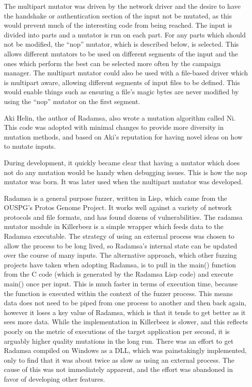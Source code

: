 The multipart mutator was driven by the network driver and the desire to have
the handshake or authentication section of the input not be mutated, as this
would prevent much of the interesting code from being reached.  The input is
divided into parts and a mutator is run on each part. For any parts which
should not be modified, the ``nop'' mutator, which is described below, is
selected. This allows different mutators to be used on different segments of
the input and the ones which perform the best can be selected more often by the
campaign manager.  The multipart mutator could also be used with a file-based
driver which is multipart aware, allowing different segments of input files to
be defined.  This would enable things such as ensuring a file's magic bytes are
never modified by using the ``nop'' mutator on the first segment.

Aki Helin, the author of Radamsa, also wrote a mutation algorithm called Ni.
This code was adopted with minimal changes to provide more diversity in
mutation methods, and based on Aki's reputation for having novel ideas on how
to mutate inputs.

During development, it quickly became clear that having a mutator which does
not do any mutation would be handy when debugging issues.  This is how the nop
mutator was born. It was later used when the multipart mutator was developed.

Radamsa is a general purpose fuzzer, written in Lisp, which came from the
OUSPG's Protos Genome Project.\cite{genome} It works well against a variety of network
protocols and file formats, and has found dozens of vulnerabilities.  The
radamsa mutator module in Killerbeez is a simple wrapper which feeds data
to the Radamsa executable.  The strategy of using an external process was chosen
to allow the process to be long lived, so Radamsa's internal state can be
updated over the course of many inputs.  The alternative approach, which
other fuzzing projects have taken when adopting Radamsa, is to pull in the main()
function from the C code (which is generated by the Radamsa Lisp code) and
execute main() once per input.\cite{radamsatob}  This is much faster
in terms of execution time, because the function is executed within the context of the
fuzzer process.  This means data does not need to be piped from one process
to another and then back again, however it loses a key value of Radamsa, which
is that it tends to get better as it sees more data. While the implementation
in Killerbeez is slower, and this reflects poorly on the metric of executions
of the target application per second, it is arguably higher quality mutations
in the long run.  There was an effort to get Radamsa compiled on Windows as a
DLL, which was painstakingly implemented, only to find that it was about twice
as slow as using an external process. The cause of this was not immediately
apparent, and the effort was abandoned in favor of developing other features.

